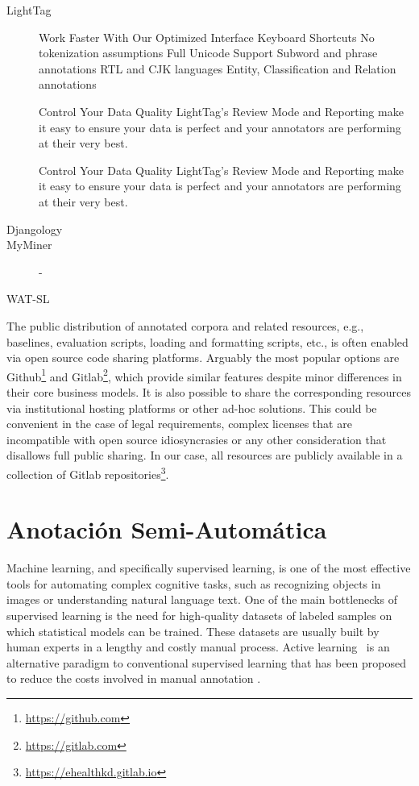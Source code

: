 \begin{description}
    \item[LightTag]

    Work Faster With Our Optimized Interface
Keyboard Shortcuts
No tokenization assumptions
Full Unicode Support
Subword and phrase annotations
RTL and CJK languages
Entity, Classification and Relation annotations

Control Your Data Quality
LightTag's Review Mode and Reporting make it easy to ensure your data is perfect and your annotators are performing at their very best.

Control Your Data Quality
LightTag's Review Mode and Reporting make it easy to ensure your data is perfect and your annotators are performing at their very best.

    \item[Djangology]
    \item[MyMiner]-
    \item[WAT-SL]
  \end{description}

  The public distribution of annotated corpora and related resources, e.g., baselines, evaluation scripts,
  loading and formatting scripts, etc., is often enabled via open source code sharing platforms.
  Arguably the most popular options are Github\footnote{\url{https://github.com}} and
  Gitlab\footnote{\url{https://gitlab.com}}, which provide similar features despite minor
  differences in their core business models.
  It is also possible to share the corresponding resources via institutional hosting platforms or
  other ad-hoc solutions. This could be convenient in the case of legal requirements, complex licenses that are incompatible with open source idiosyncrasies or any other consideration
  that disallows full public sharing.
  In our case, all resources are publicly available in a collection of Gitlab repositories\footnote{\url{https://ehealthkd.gitlab.io}}.

  \section{Anotación Semi-Automática}

Machine learning, and specifically supervised learning, is one of the most effective tools for automating complex cognitive tasks, such as recognizing objects in images or understanding natural language text.
One of the main bottlenecks of supervised learning is the need for high-quality datasets of labeled samples on which statistical models can be trained.
These datasets are usually built by human experts in a lengthy and costly manual process.
Active learning~\cite{Cohn2010ActiveL} is an alternative paradigm to conventional supervised learning that has been proposed to reduce the costs involved in manual annotation .

